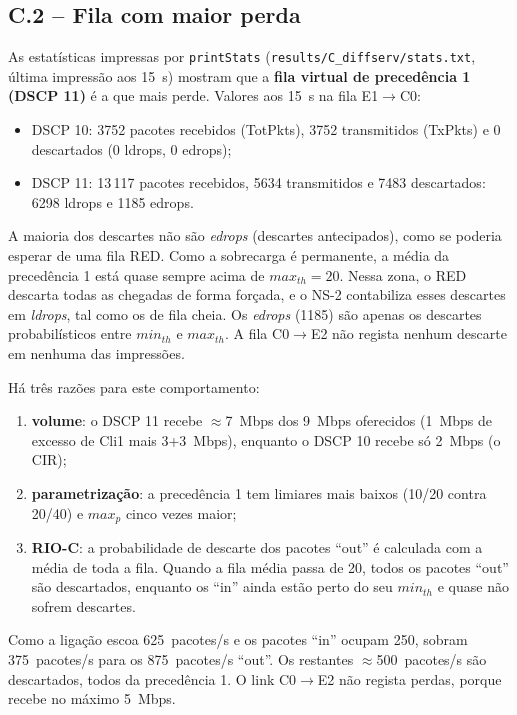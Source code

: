 \IfFileExists{llncs.cls}{\documentclass[runningheads]{llncs}}{\documentclass{article}}
\newcommand{\esp}[1]{#1}
\begin{document}
\subsection{C.2 -- Fila com maior perda}
As estatísticas impressas por \texttt{printStats} (\texttt{results/C\_diffserv/stats.txt},
última impressão aos 15~s) mostram que a \textbf{fila virtual de precedência 1 (DSCP 11)} é a
que mais perde. Valores aos 15~s na fila E1$\rightarrow$C0:
\begin{itemize}
\item DSCP 10: \esp{3752} pacotes recebidos (TotPkts), \esp{3752} transmitidos (TxPkts) e
\esp{0} descartados (\esp{0} ldrops, \esp{0} edrops);
\item DSCP 11: \esp{13\,117} pacotes recebidos, \esp{5634} transmitidos e \esp{7483}
descartados: \esp{6298} ldrops e \esp{1185} edrops.
\end{itemize}
A maioria dos descartes não são \emph{edrops} (descartes antecipados), como se poderia
esperar de uma fila RED. Como a
sobrecarga é permanente, a média da precedência 1 está quase sempre acima de
$max_{th}=20$. Nessa zona, o RED descarta todas as chegadas de forma forçada, e o NS-2
contabiliza esses descartes em \emph{ldrops}, tal como os de fila cheia. Os \emph{edrops}
(1185) são apenas os descartes probabilísticos entre $min_{th}$ e $max_{th}$. A fila C0$\rightarrow$E2
não regista nenhum descarte em nenhuma das impressões.

Há três razões para este comportamento:
\begin{enumerate}
\item \textbf{volume}: o DSCP 11 recebe $\approx$7~Mbps dos 9~Mbps oferecidos (1~Mbps de
excesso de Cli1 mais 3+3~Mbps), enquanto o DSCP 10 recebe só 2~Mbps (o CIR);
\item \textbf{parametrização}: a precedência 1 tem limiares mais baixos (10/20 contra 20/40) e
$max_p$ cinco vezes maior;
\item \textbf{RIO-C}: a probabilidade de descarte dos pacotes ``out'' é calculada com a média
de toda a fila. Quando a fila média passa de 20, todos os pacotes ``out'' são descartados,
enquanto os ``in'' ainda estão perto do seu $min_{th}$ e quase não sofrem descartes.
\end{enumerate}
Como a ligação escoa 625~pacotes/s e os pacotes ``in'' ocupam 250, sobram 375~pacotes/s para os
875~pacotes/s ``out''. Os restantes $\approx$500~pacotes/s são descartados, todos da
precedência 1. O link C0$\rightarrow$E2 não regista perdas, porque recebe no máximo 5~Mbps.
\end{document}
